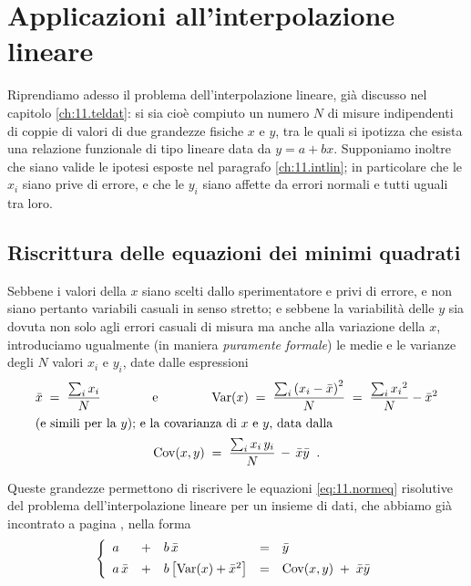 \section{Applicazioni all'interpolazione lineare}%
Riprendiamo adesso il problema dell'interpolazione lineare,
gi\`a discusso nel capitolo \ref{ch:11.teldat}: si sia
cio\`e compiuto un numero $N$ di misure indipendenti di
coppie di valori di due grandezze fisiche $x$ e $y$, tra le
quali si ipotizza che esista una relazione funzionale di
tipo lineare data da $y=a+bx $.  Supponiamo inoltre che
siano valide le ipotesi esposte nel paragrafo
\ref{ch:11.intlin}; in particolare che le $x_i$ siano prive
di errore, e che le $y_i$ siano affette da errori normali e
tutti uguali tra loro.

\subsection{Riscrittura delle equazioni dei minimi
  quadrati}%
\label{ch:c.intmed}
Sebbene i valori della $x$ siano scelti dallo sperimentatore
e privi di errore, e non siano pertanto variabili casuali in
senso stretto; e sebbene la variabilit\`a delle $y$ sia
dovuta non solo agli errori casuali di misura ma anche alla
variazione della $x$, introduciamo ugualmente (in maniera
\emph{puramente formale}) le medie e le varianze degli $N$
valori $x_i$ e $y_i$, date dalle espressioni
\begin{gather*}
  \bar x \; = \; \frac{ \sum_i x_i }{N}
  \makebox[30mm]{e}
  \var (x) \; = \; \frac{ \sum_i \left( x_i
    - \bar x \right) ^2 }{N}
    \; = \; \frac{ \sum_i {x_i}^2 }{N} -
    {\bar x} ^2 \\
  \intertext{(e simili per la $y $); e la covarianza
    di $x$ e $y$, data dalla}
  \cov (x, y) \; = \; \frac{ \sum_i x_i \,
    y_i }{N} \, - \, \bar x \bar y \peq .
\end{gather*}

Queste grandezze permettono di riscrivere le equazioni
\eqref{eq:11.normeq} risolutive del problema
dell'interpolazione lineare per un insieme di dati, che
abbiamo gi\`a incontrato a pagina \pageref{eq:11.normeq},
nella forma
\begin{equation*}%
  \index{minimi quadrati, formule dei}
  \left\{ \begin{array}{lclcl}
    a & + & b \, \bar x & = & \bar y \\[1ex]
    a \, \bar x & + & b \, \bigl[ \var(x) +
      {\bar x}^2 \bigr] & = &
    \cov(x,y) \; + \; \bar x \bar y
  \end{array} \right.
\end{equation*}

